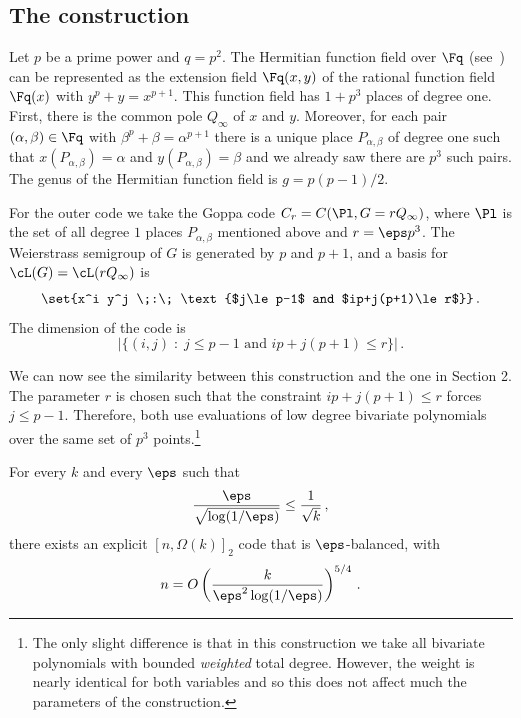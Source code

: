 \subsection{The construction}
Let $p$ be a prime power and $q=p^2$. The Hermitian function field
over $\Fq $ (see~\cite[Lemma VI.4.4]{S:93}) can be represented as
the extension field $\Fq (x,y)$ of the rational function field
$\Fq(x)$ with $y^p + y = x^{p+1}$. This function field has $1+p^3$
places of degree one. First, there is the common pole $Q_\infty$ of
$x$ and $y$. Moreover, for each pair $(\alpha, \beta)\in \Fq$ with
$\beta^p + \beta = \alpha^{p+1}$ there is a unique place
$P_{\alpha,\beta}$ of degree one such that $x(P_{\alpha,\beta}) =
\alpha$ and $y(P_{\alpha,\beta}) = \beta$ and we already saw there
are $p^3$ such pairs. The genus of the Hermitian function field is
$g=p(p-1)/2$.

For the outer code we take the Goppa code $C_r =
C(\Pl,G=rQ_\infty)$, where $\Pl$ is the set of all degree $1$ places
$P_{\alpha,\beta}$ mentioned above and $r=\eps p^3$.
%
%
%
%
The Weierstrass semigroup of $G$ is generated by $p$ and $p+1$,
and a basis for $\cL(G)=\cL(r Q_\infty)$ is $$\set{x^i y^j \;:\;
\text{$j\le p-1$ and $ip+j(p+1)\le r$}}\,.$$ The dimension of the
code is
$$\big|\{(i,j)\;:\; \text{$j\le p-1$ and $ip+j(p+1)\le r$}\} \big|\,.$$

We can now see the similarity between this construction and the one
in Section 2. The parameter $r$ is chosen such that
the constraint $ip+j(p+1)\le r$ forces  $j \le p-1$. Therefore, both
use evaluations of low degree bivariate polynomials over the same
set of $p^3$ points.\footnote{The only slight difference is that in
this construction we take all bivariate polynomials with bounded
\emph{weighted} total degree. However, the weight is nearly
identical for both variables and so this does not affect much the
parameters of the construction.}

\begin{theorem}
For every $k$ and every $\eps$ such that 
\[
\frac{\eps}
{\sqrt{\log(1/\eps)}} \le \frac{1}{\sqrt{k}}\,,
\]
there exists an
explicit $[n,\Omega(k)]_2$ code that is $\eps$-balanced, with
\[
n=O\left(\frac{k}{\eps^2 \log(1/\eps)}\right)^{5/4}\,.
\]
\end{theorem}

